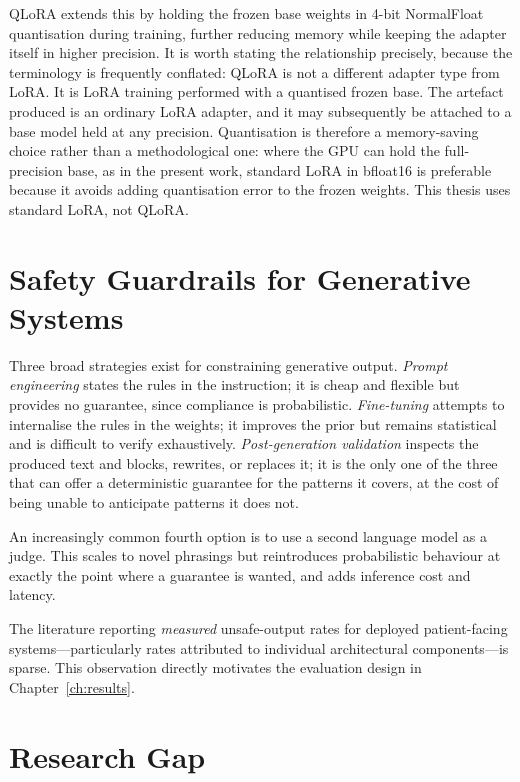 QLoRA \cite{dettmers2023qlora} extends this by holding the frozen base weights
in 4-bit NormalFloat quantisation during training, further reducing memory
while keeping the adapter itself in higher precision. It is worth stating the
relationship precisely, because the terminology is frequently conflated: QLoRA
is not a different adapter type from LoRA. It is LoRA training performed with a
quantised frozen base. The artefact produced is an ordinary LoRA adapter, and it
may subsequently be attached to a base model held at any precision. Quantisation
is therefore a memory-saving choice rather than a methodological one: where the
GPU can hold the full-precision base, as in the present work, standard LoRA in
bfloat16 is preferable because it avoids adding quantisation error to the frozen
weights. This thesis uses standard LoRA, not QLoRA.

\section{Safety Guardrails for Generative Systems}
\label{sec:guardrails}

Three broad strategies exist for constraining generative output. \emph{Prompt
engineering} states the rules in the instruction; it is cheap and flexible but
provides no guarantee, since compliance is probabilistic. \emph{Fine-tuning}
attempts to internalise the rules in the weights; it improves the prior but
remains statistical and is difficult to verify exhaustively. \emph{Post-generation
validation} inspects the produced text and blocks, rewrites, or replaces it; it
is the only one of the three that can offer a deterministic guarantee for the
patterns it covers, at the cost of being unable to anticipate patterns it does
not.

An increasingly common fourth option is to use a second language model as a
judge. This scales to novel phrasings but reintroduces probabilistic behaviour
at exactly the point where a guarantee is wanted, and adds inference cost and
latency.

The literature reporting \emph{measured} unsafe-output rates for deployed
patient-facing systems---particularly rates attributed to individual
architectural components---is sparse. This observation directly motivates the
evaluation design in Chapter~\ref{ch:results}.

\section{Research Gap}
\label{sec:gap}

